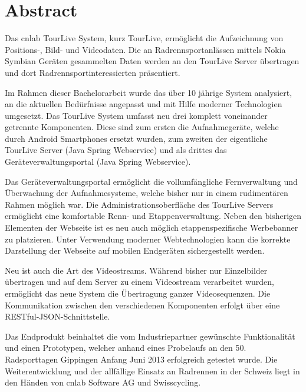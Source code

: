 \chapter*{Abstract}
Das cnlab TourLive System, kurz TourLive, ermöglicht die Aufzeichnung von Positions-, Bild- und Videodaten. Die an Radrennsportanlässen mittels Nokia Symbian Geräten gesammelten Daten werden an den TourLive Server übertragen und dort Radrennsportinteressierten präsentiert.



Im Rahmen dieser Bachelorarbeit wurde das über 10 jährige System analysiert, an die aktuellen Bedürfnisse angepasst und mit Hilfe moderner Technologien umgesetzt. Das TourLive System umfasst neu drei komplett voneinander getrennte Komponenten. Diese sind zum ersten die Aufnahmegeräte, welche durch Android Smartphones ersetzt wurden, zum zweiten der eigentliche TourLive Server (Java Spring Webservice) und als drittes das Geräteverwaltungsportal (Java Spring Webservice). 


Das Geräteverwaltungsportal ermöglicht die vollumfängliche Fernverwaltung und Überwachung der Aufnahmesysteme, welche bisher nur in einem rudimentären Rahmen möglich war. Die Administrationsoberfläche des TourLive Servers ermöglicht eine komfortable Renn- und Etappenverwaltung. Neben den bisherigen Elementen der Webseite ist es neu auch möglich etappenspezifische Werbebanner zu platzieren. Unter Verwendung moderner Webtechnologien kann die korrekte Darstellung der Webseite auf mobilen Endgeräten sichergestellt werden.


Neu ist auch die Art des Videostreams. Während bisher nur Einzelbilder übertragen und auf dem Server zu einem Videostream verarbeitet wurden, ermöglicht das neue System die Übertragung ganzer Videosequenzen. Die Kommunikation zwischen den verschiedenen Komponenten erfolgt über eine RESTful-JSON-Schnittstelle. 


Das Endprodukt beinhaltet die vom Industriepartner gewünschte Funktionalität und einen Prototypen, welcher anhand eines Probelaufs an den 50. Radsporttagen Gippingen Anfang Juni 2013 erfolgreich getestet wurde. Die Weiterentwicklung und der allfällige Einsatz an Radrennen in der Schweiz liegt in den Händen von cnlab Software AG und Swisscycling.